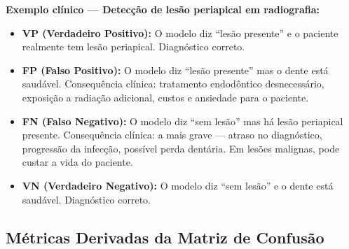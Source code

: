 \textbf{Exemplo clínico — Detecção de lesão periapical em radiografia:}
\begin{itemize}
    \item \textbf{VP (Verdadeiro Positivo):} O modelo diz ``lesão presente'' e o paciente realmente tem lesão periapical. Diagnóstico correto.
    \item \textbf{FP (Falso Positivo):} O modelo diz ``lesão presente'' mas o dente está saudável. Consequência clínica: tratamento endodôntico desnecessário, exposição a radiação adicional, custos e ansiedade para o paciente.
    \item \textbf{FN (Falso Negativo):} O modelo diz ``sem lesão'' mas há lesão periapical presente. Consequência clínica: a mais grave — atraso no diagnóstico, progressão da infecção, possível perda dentária. Em lesões malignas, pode custar a vida do paciente.
    \item \textbf{VN (Verdadeiro Negativo):} O modelo diz ``sem lesão'' e o dente está saudável. Diagnóstico correto.
\end{itemize}

\subsection{Métricas Derivadas da Matriz de Confusão}

